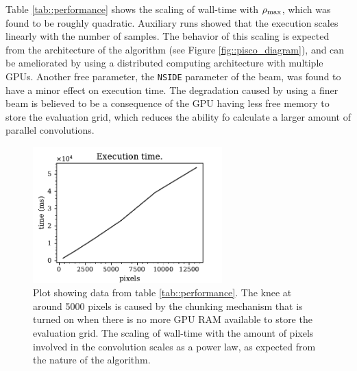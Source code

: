 \documentclass[a4paper,11pt]{article}
\begin{document}
Table \ref{tab::performance} shows the scaling of wall-time with $\rho_{\rm{max}}$, which was found to be roughly quadratic. Auxiliary runs showed that the execution scales linearly with the number of samples. The behavior of this scaling is expected from the architecture of the algorithm (see Figure \ref{fig::pisco_diagram}), and can be ameliorated by using a distributed computing architecture with multiple GPUs. Another free parameter, the \texttt{NSIDE} parameter of the beam, was found to have a minor effect on execution time. The degradation caused by using a finer beam is believed to be a consequence of the GPU having less free memory to store the evaluation grid, which reduces the ability fo calculate a larger amount of parallel convolutions.

\begin{figure}
	\centering
	\includegraphics[width=0.65\textwidth]{figures/wall_time.pdf}
	\caption{Plot showing data from table \ref{tab::performance}. The knee at around 5000 pixels is caused by the chunking mechanism that is turned on when there is no more GPU RAM available to store the evaluation grid. The scaling of wall-time with the amount of pixels involved in the convolution scales as a power law, as expected from the nature of the algorithm. }
	\label{fig::walltime}
\end{figure}
\end{document}
